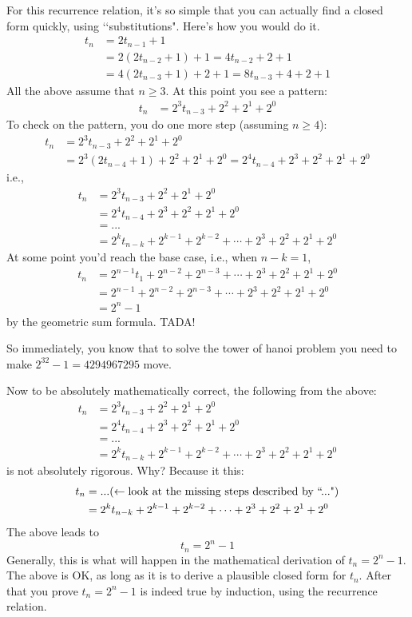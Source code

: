 For this recurrence relation, it's so simple that you can
actually find a closed form quickly, using \lq\lq substitutions".
Here's how you would do it.
\begin{align*}
t_n
&= 2 t_{n-1} + 1 \\ 
&= 2 ( 2t_{n-2} + 1) + 1 = 4t_{n-2} + 2 + 1 \\ 
&= 4 (2 t_{n-3} + 1 ) + 2 + 1 = 8 t_{n-3} + 4 + 2 + 1
\end{align*}
All the above assume that $n \geq 3$.
At this point you see a pattern:
\begin{align*}
t_n
&= 2^3 t_{n-3} + 2^2 + 2^1 + 2^0
\end{align*}
To check on the pattern, you do one more step (assuming $n \geq 4$):
\begin{align*}
t_n
&= 2^3 t_{n-3} + 2^2 + 2^1 + 2^0 \\ 
&= 2^3 (2t_{n-4} + 1) + 2^2 + 2^1 + 2^0 = 2^4t_{n-4} + 2^3 + 2^2 + 2^1 + 2^0
\end{align*}
i.e.,
\begin{align*}
t_n
&= 2^3 t_{n-3} + 2^2 + 2^1 + 2^0 \\ 
&= 2^4t_{n-4} + 2^3 + 2^2 + 2^1 + 2^0 \\
&= ... \\
&= 2^kt_{n-k} + 2^{k-1} + 2^{k-2} + \cdots + 2^3 + 2^2 + 2^1 + 2^0
\end{align*}
At some point you'd reach the base case, i.e., when $n - k = 1$,
\begin{align*}
t_n
&= 2^{n-1}t_{1} + 2^{n-2} + 2^{n-3} + \cdots + 2^3 + 2^2 + 2^1 + 2^0 \\
&= 2^{n-1} + 2^{n-2} + 2^{n-3} + \cdots + 2^3 + 2^2 + 2^1 + 2^0 \\
&= 2^n - 1
\end{align*}
by the geometric sum formula.
TADA!

So immediately, you know that to solve the tower of hanoi problem
you need to make $2^{32} - 1 = 4294967295$ move.

Now to be absolutely mathematically correct, the following
from the above:
\begin{align*}
t_n
&= 2^3 t_{n-3} + 2^2 + 2^1 + 2^0 \\ 
&= 2^4t_{n-4} + 2^3 + 2^2 + 2^1 + 2^0 \\
&= ... \\
&= 2^kt_{n-k} + 2^{k-1} + 2^{k-2} + \cdots + 2^3 + 2^2 + 2^1 + 2^0
\end{align*}
is not absolutely rigorous.
Why? Because it this:
\begin{align*}
t_n
&= ... (\leftarrow \text{look at the missing steps described by \lq\lq ..."}) \\ 
&= 2^kt_{n-k} + 2^{k-1} + 2^{k-2} + \cdots + 2^3 + 2^2 + 2^1 + 2^0
\end{align*}
The above leads to
\[
t_n = 2^n - 1
\]
Generally, this is what will happen in the mathematical derivation
of 
$t_n = 2^n - 1$.
The above is OK, as long as it is to derive a plausible closed form for $t_n$.
After that you prove $t_n = 2^n - 1$ is indeed true by induction, using the recurrence relation.

